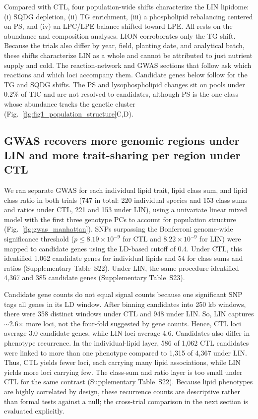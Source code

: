 \documentclass[9pt,twocolumn,twoside]{rilabRxiv}
\begin{document}
Compared with CTL, four population-wide shifts characterize the LIN lipidome: (i) SQDG depletion, (ii) TG enrichment, (iii) a phospholipid rebalancing centered on PS, and (iv) an LPC/LPE balance shifted toward LPE. All rests on the abundance and composition analyses. LION corroborates only the TG shift. Because the trials also differ by year, field, planting date, and analytical batch, these shifts characterize LIN as a whole and cannot be attributed to just nutrient supply and cold. The reaction-network and GWAS sections that follow ask which reactions and which loci accompany them. Candidate genes below follow for the TG and SQDG shifts. The PS and lysophospholipid changes sit on pools under 0.2\% of TIC and are not resolved to candidates, although PS is the one class whose abundance tracks the genetic cluster (Fig.~\ref{fig:fig1_population_structure}C,D).

\subsection*{GWAS recovers more genomic regions under LIN and more trait-sharing per region under CTL}

We ran separate GWAS for each individual lipid trait, lipid class sum, and lipid class ratio in both trials (747 in total: 220 individual species and 153 class sums and ratios under CTL, 221 and 153 under LIN), using a univariate linear mixed model with the first three genotype PCs to account for population structure (Fig.~\ref{fig:gwas_manhattan}). SNPs surpassing the Bonferroni genome-wide significance threshold ($p \leq 8.19 \times 10^{-9}$ for CTL and $8.22 \times 10^{-9}$ for LIN) were mapped to candidate genes using the LD-based cutoff of 0.4. Under CTL, this identified 1,062 candidate genes for individual lipids and 54 for class sums and ratios (Supplementary Table~S22). Under LIN, the same procedure identified 4,367 and 385 candidate genes (Supplementary Table~S23).

Candidate gene counts do not equal signal counts because one significant SNP tags all genes in its LD window. After binning candidates into 250 kb windows, there were 358 distinct windows under CTL and 948 under LIN. So, LIN captures $\sim$2.6$\times$ more loci, not the four-fold suggested by gene counts. Hence, CTL loci average 3.0 candidate genes, while LIN loci average 4.6. Candidates also differ in phenotype recurrence. In the individual-lipid layer, 586 of 1,062 CTL candidates were linked to more than one phenotype compared to 1,315 of 4,367 under LIN. Thus, CTL yields fewer loci, each carrying many lipid associations, while LIN yields more loci carrying few. The class-sum and ratio layer is too small under CTL for the same contrast (Supplementary Table~S22). Because lipid phenotypes are highly correlated by design, these recurrence counts are descriptive rather than formal tests against a null; the cross-trial comparison in the next section is evaluated explicitly.
\end{document}
